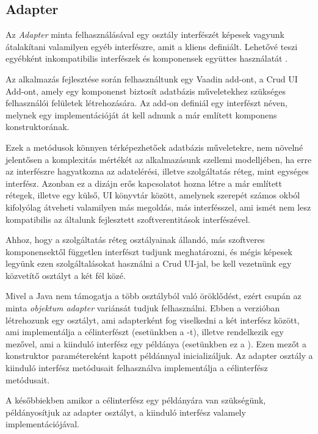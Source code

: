 \subsection{Adapter}

Az \emph{Adapter} minta felhasználásával egy osztály interfészét képesek vagyunk átalakítani valamilyen egyéb interfészre, amit a kliens definiált. Lehetővé teszi egyébként inkompatibilis interfészek és komponensek együttes használatát \cite{gamma1995elements}. \par

Az alkalmazás fejlesztése során felhasználtunk egy Vaadin add-ont, a Crud UI Add-ont, amely egy komponenst biztosít adatbázis műveletekhez szükséges felhasználói felületek létrehozására. Az add-on definiál egy interfészt  néven, melynek egy implementációját át kell adnunk a már említett komponens konstruktorának.


Ezek a metódusok könnyen térképezhetőek adatbázis műveletekre, nem növelné jelentősen a komplexitás mértékét az alkalmazásunk szellemi modelljében, ha erre az interfészre hagyatkozna az adatelérési, illetve szolgáltatás réteg, mint egységes interfész. Azonban ez a dizájn erős kapcsolatot hozna létre a már említett rétegek, illetve egy külső, UI könyvtár között, amelynek szerepét számos okból kifolyólag átveheti valamilyen más megoldás, más interfésszel, ami ismét nem lesz kompatibilis az általunk fejlesztett szoftverentitások interfészével. \par


Ahhoz, hogy a szolgáltatás réteg osztályainak állandó, más szoftveres komponensektől független interfészt tudjunk meghatározni, és mégis képesek legyünk ezen szolgáltalásokat használni a Crud UI-jal, be kell vezetnünk egy közvetítő osztályt a két fél közé. \par

Mivel a Java nem támogatja a több osztályból való öröklődést, ezért csupán az  minta \emph{objektum adapter} variánsát tudjuk felhasználni. Ebben a verzióban létrehozunk egy osztályt, ami adapterként fog viselkedni a két interfész között, ami implementálja a célinterfészt (esetünkben a -t), illetve rendelkezik egy mezővel, ami a kiinduló interfész egy példánya (esetünkben ez a ). Ezen mezőt a konstruktor paramétereként kapott példánnyal inicializáljuk. Az adapter osztály a kiinduló interfész metódusait felhasználva implementálja a célinterfész metódusait. \par


A későbbiekben amikor a célinterfész egy példányára van szükségünk, példányosítjuk az adapter osztályt, a kiinduló interfész valamely implementációjával.

